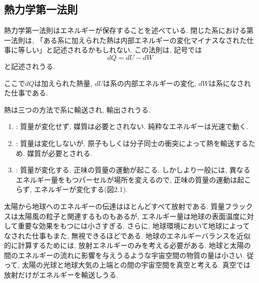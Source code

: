 \documentclass[a4j,12pt,openbib,oneside,dvipdfmx]{jbook}
\begin{document}
\subsection{熱力学第一法則}
\par
熱力学第一法則はエネルギーが保存することを述べている. 閉じた系における第一法則は, 「ある系に加えられた熱は内部エネルギーの変化マイナスなされた仕事に等しい」と記述されるかもしれない. この法則は, 記号では
\begin{equation}
  dQ=dU-dW
\end{equation}
と記述されうる.
\par
ここで$dQ$は加えられた熱量, $dU$は系の内部エネルギーの変化, $dW$は系になされた仕事である.
\par
熱は三つの方法で系に輸送され, 輸出されうる.
\begin{enumerate}
  \item{: 質量が変化せず, 媒質は必要とされない. 純粋なエネルギーは光速で動く.}
  \item{: 質量は変化しないが, 原子もしくは分子同士の衝突によって熱を輸送するため. 媒質が必要とされる.}
  \item{: 質量が変化する. 正味の質量の運動が起こる. しかしより一般には, 異なるエネルギー量をもつパーセルが場所を変えるので, 正味の質量の運動は起こらず, エネルギーが変化する(図2.1).}
\end{enumerate}
\par
太陽から地球へのエネルギーの伝達はほとんどすべて放射である. 質量フラックスは太陽風の粒子と関連するものもあるが, エネルギー量は地球の表面温度に対して重要な効果をもつには小さすぎる. 
さらに, 地球環境において地球によってなされた仕事もまた, 無視できるほどである. 地球のエネルギーバランスを近似的に計算するためには, 放射エネルギーのみを考える必要がある. 
地球と太陽の間のエネルギーの流れに影響を与えうるような宇宙空間の物質の量は小さい. 従って, 太陽の光球と地球大気の上端との間の宇宙空間を真空と考える. 
真空では放射だけがエネルギーを輸送しうる. 
\end{document}
